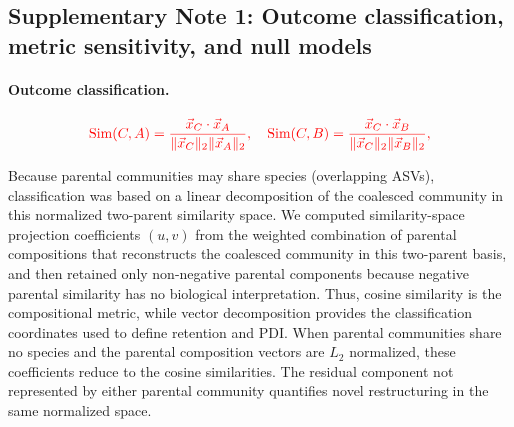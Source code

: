 
\subsection*{Supplementary Note 1: Outcome classification, metric sensitivity, and null models}
\label{sec:suppl:note1}


\paragraph{Outcome classification.}
\begin{equation}
\textcolor{red}{\text{Sim}(C, A) = \frac{\vec{x}_C \cdot \vec{x}_A}{\|\vec{x}_C\|_2 \|\vec{x}_A\|_2}, \quad
\text{Sim}(C, B) = \frac{\vec{x}_C \cdot \vec{x}_B}{\|\vec{x}_C\|_2 \|\vec{x}_B\|_2},}
\end{equation}

Because parental communities may share species (overlapping ASVs), classification was based on a linear decomposition of the coalesced community in this normalized two-parent similarity space. We computed similarity-space projection coefficients $(u, v)$ from the weighted combination of parental compositions that reconstructs the coalesced community in this two-parent basis, and then retained only non-negative parental components because negative parental similarity has no biological interpretation. Thus, cosine similarity is the compositional metric, while vector decomposition provides the classification coordinates used to define retention and PDI. When parental communities share no species and the parental composition vectors are $L_2$ normalized, these coefficients reduce to the cosine similarities. The residual component not represented by either parental community quantifies novel restructuring in the same normalized space.

